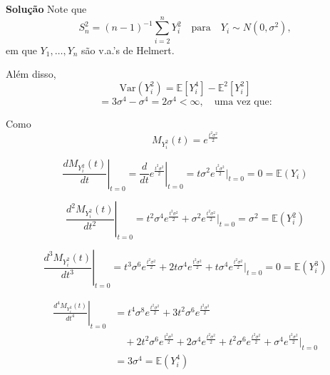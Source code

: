 \textbf{Solução} Note que
\begin{equation}
S_n^2 = (n-1)^{-1} \sum_{i=2}^n Y_i^2 \quad \text{para} \quad Y_i \sim N(0, \sigma^2),
\end{equation}
em que $Y_1, \ldots, Y_n$ são v.a.'s de Helmert.

Além disso,
\begin{equation}
\mathrm{Var}(Y_i^2) = \mathbb{E}[Y_i^4] - \mathbb{E}^2[Y_i^2]
\end{equation}
\begin{equation}
= 3\sigma^4 - \sigma^4 = 2\sigma^4 < \infty, \quad \text{uma vez que:}
\end{equation}

Como
\begin{equation}
M_{Y_i^2}(t) = e^{\frac{t^2\sigma^2}{2}}
\end{equation}

\begin{equation}
\left. \frac{d M_{Y_i^2}(t)}{dt} \right|_{t=0} = \left. \frac{d}{dt} e^{\frac{t^2\sigma^2}{2}} \right|_{t=0} = t\sigma^2 e^{\frac{t^2\sigma^2}{2}} \bigg|_{t=0} = 0 = \mathbb{E}(Y_i)
\end{equation}

\begin{equation}
\left. \frac{d^2 M_{Y_i^2}(t)}{dt^2} \right|_{t=0} = t^2\sigma^4 e^{\frac{t^2\sigma^2}{2}} + \sigma^2 e^{\frac{t^2\sigma^2}{2}} \bigg|_{t=0} = \sigma^2 = \mathbb{E}(Y_i^2)
\end{equation}

\begin{equation}
\left. \frac{d^3 M_{Y_i^2}(t)}{dt^3} \right|_{t=0} = t^3\sigma^6 e^{\frac{t^2\sigma^2}{2}} + 2t\sigma^4 e^{\frac{t^2\sigma^2}{2}} + t\sigma^4 e^{\frac{t^2\sigma^2}{2}} \bigg|_{t=0} = 0 = \mathbb{E}(Y_i^3)
\end{equation}

\begin{equation}
\begin{aligned}
\left. \frac{d^4 M_{Y_i^2}(t)}{dt^4} \right|_{t=0} &= t^4\sigma^8 e^{\frac{t^2\sigma^2}{2}} + 3t^2\sigma^6 e^{\frac{t^2\sigma^2}{2}} \\
&\quad + 2t^2\sigma^6 e^{\frac{t^2\sigma^2}{2}} + 2\sigma^4 e^{\frac{t^2\sigma^2}{2}} + t^2\sigma^6 e^{\frac{t^2\sigma^2}{2}} + \sigma^4 e^{\frac{t^2\sigma^2}{2}} \bigg|_{t=0} \\
&= 3\sigma^4 = \mathbb{E}(Y_i^4)
\end{aligned}
\end{equation}